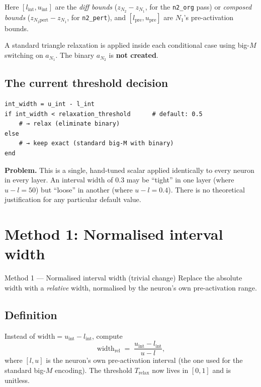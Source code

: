 \documentclass[11pt,a4paper]{article}
\newcommand{\Trelax}{T_{\mathrm{relax}}}
\newcommand{\widthop}{\mathrm{width}}
\begin{document}
Here $[l_{\mathrm{int}}, u_{\mathrm{int}}]$ are the \emph{diff bounds}
($z_{N_2} - z_{N_1}$, for the \texttt{n2\_org} pass) or \emph{composed bounds}
($z_{N_2\text{pert}} - z_{N_1}$, for \texttt{n2\_pert}), and
$[l_{\mathrm{pre}}, u_{\mathrm{pre}}]$ are $N_1$'s pre-activation bounds.

A standard triangle relaxation is applied inside each conditional case using
big-$M$ switching on $a_{N_1}$.  The binary $a_{N_2}$ is \textbf{not created}.

\subsection{The current threshold decision}

\begin{yourcode}
\begin{verbatim}
int_width = u_int - l_int
if int_width < relaxation_threshold      # default: 0.5
    # → relax (eliminate binary)
else
    # → keep exact (standard big-M with binary)
end
\end{verbatim}
\end{yourcode}

\noindent\textbf{Problem.}
This is a single, hand-tuned scalar applied identically to every neuron in every
layer.  An interval width of 0.3 may be ``tight'' in one layer (where
$u - l = 50$) but ``loose'' in another (where $u - l = 0.4$).  There is no
theoretical justification for any particular default value.


\section{Method 1: Normalised interval width}\label{sec:method1}

\begin{idea}{Method 1 --- Normalised interval width (trivial change)}
Replace the absolute width with a \emph{relative} width, normalised by the
neuron's own pre-activation range.
\end{idea}

\subsection{Definition}
Instead of
$\widthop = u_{\mathrm{int}} - l_{\mathrm{int}}$,
compute
\begin{equation}\label{eq:relwidth}
  \widthop_{\mathrm{rel}}
  \;=\;
  \frac{u_{\mathrm{int}} - l_{\mathrm{int}}}{u - l},
\end{equation}
where $[l,u]$ is the neuron's own pre-activation interval (the one used for the
standard big-$M$ encoding).  The threshold $\Trelax$ now lives in $[0,1]$ and is
unitless.
\end{document}
